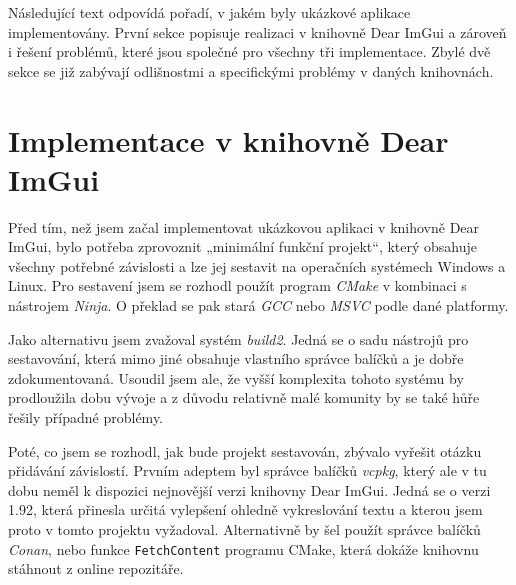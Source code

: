 \documentclass[FM,DP]{tulthesis}
\begin{document}
	Následující text odpovídá pořadí, v jakém byly ukázkové aplikace implementovány. První sekce popisuje realizaci v knihovně Dear ImGui a zároveň i řešení problémů, které jsou společné pro všechny tři implementace. Zbylé dvě sekce se již zabývají odlišnostmi a specifickými problémy v daných knihovnách.
	
	\section{Implementace v knihovně Dear ImGui}
	
	Před tím, než jsem začal implementovat ukázkovou aplikaci v knihovně Dear \mbox{ImGui}, bylo potřeba zprovoznit „minimální funkční projekt“, který obsahuje všechny potřebné závislosti a lze jej sestavit na operačních systémech Windows a Linux. Pro sestavení jsem se rozhodl použít program \textit{CMake} v kombinaci s nástrojem \textit{Ninja}. O překlad se pak stará \textit{GCC} nebo \textit{MSVC} podle dané platformy.
	
	Jako alternativu jsem zvažoval systém \textit{build2}. Jedná se o sadu nástrojů pro sestavování, která mimo jiné obsahuje vlastního správce balíčků a je dobře zdokumentovaná. Usoudil jsem ale, že vyšší komplexita tohoto systému by prodloužila dobu vývoje a z důvodu relativně malé komunity by se také hůře řešily případné problémy.
	
	
	Poté, co jsem se rozhodl, jak bude projekt sestavován, zbývalo vyřešit otázku přidávání závislostí. Prvním adeptem byl správce balíčků \textit{vcpkg}, který ale v tu dobu neměl k dispozici nejnovější verzi knihovny Dear ImGui. Jedná se o verzi 1.92, která přinesla určitá vylepšení ohledně vykreslování textu a kterou jsem proto v tomto projektu vyžadoval. Alternativně by šel použít správce balíčků \textit{Conan}, nebo funkce \texttt{FetchContent} programu CMake, která dokáže knihovnu stáhnout z online repozitáře.
	
\end{document}
